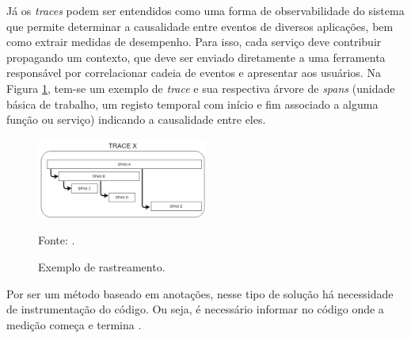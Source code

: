 Já os \textit{traces} podem ser entendidos como uma forma de observabilidade do sistema que permite determinar a causalidade entre eventos de diversos aplicações, bem como extrair medidas de desempenho. Para isso, cada serviço deve contribuir propagando um contexto, que deve ser enviado diretamente a uma ferramenta responsável por correlacionar cadeia de eventos e apresentar aos usuários. Na Figura \ref{fig:exemplo-trace}, tem-se um exemplo de \textit{trace} e sua respectiva árvore de \textit{spans} (unidade básica de trabalho, um registo temporal com início e fim associado a alguma função ou serviço) indicando a causalidade entre eles.

\begin{figure}[ht]
    \centering
    \includegraphics[width=0.5\textwidth]{images/exemplo-trace.png}
    \caption{Exemplo de rastreamento.}
    \footnotesize Fonte: .
    \label{fig:exemplo-trace}
\end{figure}

Por ser um método baseado em anotações, nesse tipo de solução há necessidade de instrumentação do código. Ou seja, é necessário informar no código onde a medição começa e termina \cite{sigelman2010tracing}.



